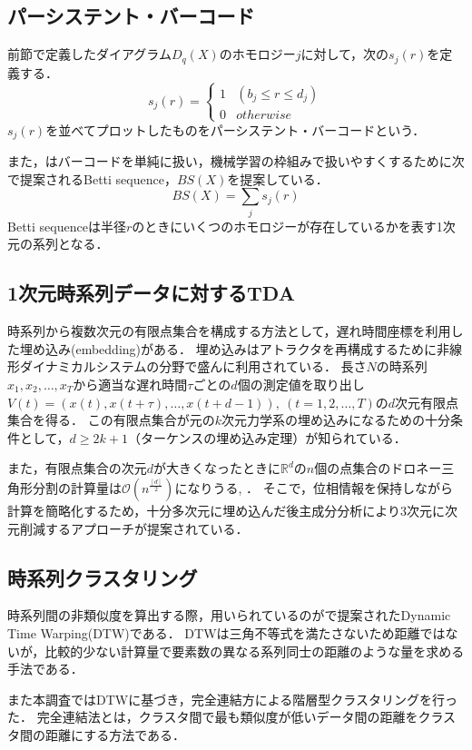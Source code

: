 \documentclass{jarticle}
\begin{document}
\subsection{パーシステント・バーコード}
前節で定義したダイアグラム$D_q(X)$のホモロジー$j$に対して，次の$s_j(r)$を定義する．
$$
s_j(r) = 
\begin{cases}
1 & (b_j \leq r \leq d_j)\\
0 & otherwise
\end{cases}
$$
$s_j(r)$を並べてプロットしたものをパーシステント・バーコードという．

また，\cite{Umeda2017}はバーコードを単純に扱い，機械学習の枠組みで扱いやすくするために次で提案されるBetti sequence，$BS(X)$を提案している．
$$
BS(X) = \sum_j s_j(r)
$$
Betti sequenceは半径$r$のときにいくつのホモロジーが存在しているかを表す1次元の系列となる．

\subsection{1次元時系列データに対するTDA}
時系列から複数次元の有限点集合を構成する方法として，遅れ時間座標を利用した埋め込み(embedding)がある．
埋め込みはアトラクタを再構成するために非線形ダイナミカルシステムの分野で盛んに利用されている．
長さ$N$の時系列$x_1, x_2, \dots , x_T$から適当な遅れ時間$\tau$ごとの$d$個の測定値を取り出し$V(t) = (x(t), x(t+\tau), \dots, x(t + d - 1)),\ (t = 1,2,\dots, T)$の$d$次元有限点集合を得る．
この有限点集合が元の$k$次元力学系の埋め込みになるための十分条件として，$d\geq 2k+1$（ターケンスの埋め込み定理\cite{Takens1981}）が知られている．

また，有限点集合の次元$d$が大きくなったときに$\mathbb R^d$の$n$個の点集合のドロネー三角形分割の計算量は$\mathcal O(n^{\frac{[d]}{2}})$になりうる\cite{Amenta2007}, \cite{Attali2003}．
そこで，位相情報を保持しながら計算を簡略化するため，十分多次元に埋め込んだ後主成分分析により3次元に次元削減するアプローチが提案されている\cite{Truong2017}．


\subsection{時系列クラスタリング}
時系列間の非類似度を算出する際，用いられているのが\cite{Berndt1996}で提案されたDynamic Time Warping(DTW)である．
DTWは三角不等式を満たさないため距離ではないが，比較的少ない計算量で要素数の異なる系列同士の距離のような量を求める手法である．

また本調査ではDTWに基づき，完全連結方による階層型クラスタリングを行った．
完全連結法とは，クラスタ間で最も類似度が低いデータ間の距離をクラスタ間の距離にする方法である．
\end{document}
